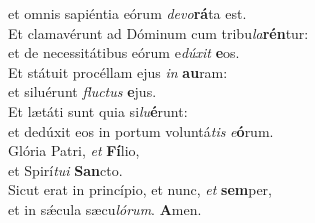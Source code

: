 \oddverse et omnis sapiéntia eórum \textit{de}\textit{vo}\textbf{rá}ta est.\\
\evenverse Et clamavérunt ad Dóminum cum tribu\textit{la}\textbf{rén}tur:~\*\\
\evenverse et de necessitátibus eórum e\textit{dú}\textit{xit} \textbf{e}os.\\
\oddverse Et státuit procéllam ejus \textit{in} \textbf{au}ram:~\*\\
\oddverse et siluérunt \textit{flu}\textit{ctus} \textbf{e}jus.\\
\evenverse Et lætáti sunt quia si\textit{lu}\textbf{é}runt:~\*\\
\evenverse et dedúxit eos in portum voluntá\textit{tis} \textit{e}\textbf{ó}rum.\\
\oddverse Glória Patri, \textit{et} \textbf{Fí}lio,~\*\\
\oddverse et Spirí\textit{tu}\textit{i} \textbf{San}cto.\\
\evenverse Sicut erat in princípio, et nunc, \textit{et} \textbf{sem}per,~\*\\
\evenverse et in sǽcula sæcu\textit{ló}\textit{rum}. \textbf{A}men.\\
